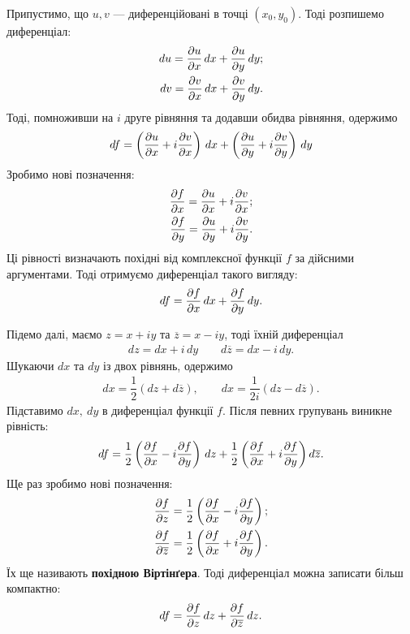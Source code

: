 \documentclass{math_library}
\begin{document}
Припустимо, що $u,v$ --- диференційовані в точці $(x_0,y_0)$. Тоді розпишемо диференціал:
\begin{align*}
du = \dfrac{\partial {u}}{\partial {x}}\,dx + \dfrac{\partial {u}}{\partial {y}}\,dy; \\
dv = \dfrac{\partial {v}}{\partial {x}}\,dx + \dfrac{\partial {v}}{\partial {y}}\,dy.
\end{align*}
Тоді, помноживши на $i$ друге рівняння та додавши обидва рівняння, одержимо
\begin{align*}
df = \left( \dfrac{\partial {u}}{\partial {x}} + i \dfrac{\partial {v}}{\partial {x}} \right)\,dx + \left( \dfrac{\partial {u}}{\partial {y}} + i \dfrac{\partial {v}}{\partial {y}} \right)\,dy
\end{align*}
Зробимо нові позначення:
\begin{align*}
\dfrac{\partial {f}}{\partial {x}} = \dfrac{\partial {u}}{\partial {x}} + i \dfrac{\partial {v}}{\partial {x}}; \\
\dfrac{\partial {f}}{\partial {y}} = \dfrac{\partial {u}}{\partial {y}} + i \dfrac{\partial {v}}{\partial {y}}.
\end{align*}
Ці рівності визначають похідні від комплексної функції $f$ за дійсними аргументами. Тоді отримуємо диференціал такого вигляду:
\begin{align*}
df = \dfrac{\partial {f}}{\partial {x}}\,dx + \dfrac{\partial {f}}{\partial {y}}\,dy.
\end{align*}

Підемо далі, маємо $z = x+iy$ та $\overline{z} = x  -iy$, тоді їхній диференціал
\begin{align*}
dz = dx + i\,dy \qquad d\overline{z} = dx - i\,dy.
\end{align*}
Шукаючи $dx$ та $dy$ із двох рівнянь, одержимо
\begin{align*}
dx = \dfrac{1}{2} (dz + d \overline{z}), \qquad dx = \dfrac{1}{2i} (dz - d \overline{z}).
\end{align*}
Підставимо $dx,\ dy$ в диференціал функції $f$. Після певних групувань виникне рівність:
\begin{align*}
df = \dfrac{1}{2} \left( \dfrac{\partial {f}}{\partial {x}} - i \dfrac{\partial {f}}{\partial {y}}\right)\,dz + \dfrac{1}{2}\left( \dfrac{\partial {f}}{\partial {x}} + i \dfrac{\partial {f}}{\partial {y}}\right)d\overline{z}.
\end{align*}
Ще раз зробимо нові позначення:
\begin{align*}
\dfrac{\partial {f}}{\partial {z}} = \dfrac{1}{2} \left( \dfrac{\partial {f}}{\partial {x}} - i \dfrac{\partial {f}}{\partial {y}} \right); \\
\dfrac{\partial {f}}{\partial {\overline{z}}} = \dfrac{1}{2} \left( \dfrac{\partial {f}}{\partial {x}} + i \dfrac{\partial {f}}{\partial {y}} \right).
\end{align*}
Їх ще називають \textbf{похідною Віртінґера}. Тоді диференціал можна записати більш компактно:
\begin{align*}
df = \dfrac{\partial {f}}{\partial {z}}\,dz + \dfrac{\partial {f}}{\partial {\overline{z}}}\,dz.
\end{align*}
\end{document}
